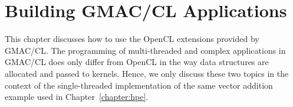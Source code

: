 \chapter{Building GMAC\slash CL Applications}

This chapter discusses how to use the OpenCL extensions provided by GMAC\slash CL\@. The programming 
of multi\hyp{}threaded and complex applications in GMAC\slash CL does only differ from OpenCL in the 
way data structures are allocated and passed to kernels. Hence, we only discuss these two topics in 
the context of the single\hyp{}threaded implementation of the same vector addition example used in 
Chapter~\ref{chapter:hpe}. 



